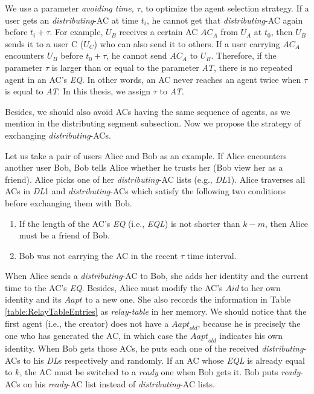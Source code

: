 We use a parameter \textit{avoiding time,} $\tau$, to optimize the agent selection strategy. If a user gets an \textit{distributing}-AC at time $t_i$, he cannot get that \textit{distributing}-AC again before $t_i+\tau $. For example, $U_B$ receives a certain AC ${AC}_A$ from $U_A$ at $t_0$, then $U_B$ sends it to a user C ($U_C$) who can also send it to others. If a user carrying ${AC}_A$ encounters $U_B$  before $t_0+\tau $, he cannot send ${AC}_A$ to $U_B$. Therefore, if the parameter $\tau $ is larger than or equal to the parameter \textit{AT}, there is no repeated agent in an AC's \textit{EQ}. In other words, an AC never reaches an agent twice when $\tau $ is equal to \textit{AT}. In this thesis, we assign $\tau $ to \textit{AT}. 

Besides, we should also avoid ACs having the same sequence of agents, as we mention in the distributing segment subsection. Now we propose the strategy of exchanging \textit{distributing}-ACs.

Let us take a pair of users Alice and Bob as an example. If Alice encounters another user Bob, Bob tells Alice whether he trusts her (Bob view her as a friend). Alice picks one of her \textit{distributing}-AC lists (e.g., \textit{DL}1). Alice traverses all ACs in \textit{DL}1 and \textit{distributing}-ACs which satisfy the following two conditions before exchanging them with Bob.

\begin{enumerate}
\item  If the length of the AC's \textit{EQ} (i.e., \textit{EQL}) is not shorter than $k-m$, then Alice must be a friend of Bob.

\item  Bob was not carrying the AC in the recent $\tau $ time interval.
\end{enumerate}

When Alice sends a \textit{distributing}-AC to Bob, she adds her identity and the current time to the AC's \textit{EQ}. Besides, Alice must modify the AC's $Aid\mathrm{\ }$to her own identity and its $Aapt$ to a new one. She also records the information in Table \ref{table:RelayTableEntries} as \textit{relay-table} in her memory. We should notice that the first agent (i.e., the creator) does not have a ${Aapt}_{old}$, because he is precisely the one who has generated the AC, in which case the ${Aapt}_{old}$ indicates his own identity. When Bob gets those ACs, he puts each one of the received \textit{distributing}-ACs to his \textit{DL}s respectively and randomly. If an AC whose \textit{EQL} is already equal to $k$, the AC must be switched to a \textit{ready} one when Bob gets it. Bob puts \textit{ready}-ACs on his \textit{ready}-AC list instead of \textit{distributing}-AC lists.

